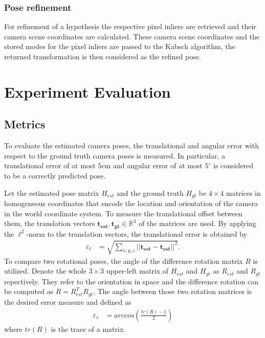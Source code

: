 \documentclass[final]{cvpr}
\begin{document}
\subsubsection{Pose refinement}
For refinement of a hypothesis the respective pixel inliers are retrieved and their camera scene 
coordinates are calculated. These camera scene coordinates and the stored modes for the pixel inliers 
are passed to the Kabsch algorithm, the returned transformation is then considered as the refined pose.



\section{Experiment Evaluation}


\subsection{Metrics} \label{subsec:metrics}
To evaluate the estimated camera poses, the translational and angular error with respect to the 
ground truth camera poses is measured. In particular, a translational error of at 
most $5$cm and angular error of at most $5^{\circ}$ is considered to be a correctly predicted pose. 

Let the estimated pose matrix $H_{est}$ and the ground truth $H_{gt}$ be $4 \times 4$ matrices
in homogeneous coordinates that encode the location and orientation of the camera in the world 
coordinate system. To measure the translational offset between them, the translation vectors 
$\boldsymbol{t_{est}}, \boldsymbol{t_{gt}} \in \mathbb{R}^3$ of the matrices are used.
By applying the $\ell^2$-norm to the translation vectors, the translational error is obtained by
\begin{align}
    \varepsilon_t &= \sqrt{\sum_{x,y,z}||\boldsymbol{t_{est}} - \boldsymbol{t_{est}}||^2}.
\end{align}
To compare two rotational poses, the angle of the difference rotation matrix $R$ is utilized. 
Denote the whole $3\times3$ upper-left matrix of $H_{est}$ and $H_{gt}$ as $R_{est}$ and 
$R_{gt}$ repectively. They refer to the orientation in space and the difference rotation can be computed 
as $R = R_{est}^TR_{gt}$. The angle between those two rotation matrices is the desired
error measure and defined as
\begin{align}
    \varepsilon_r &= arccos \left( \frac{tr(R)-1}{2} \right)
\end{align}
where $tr(R)$ is the trace of a matrix.
\end{document}
